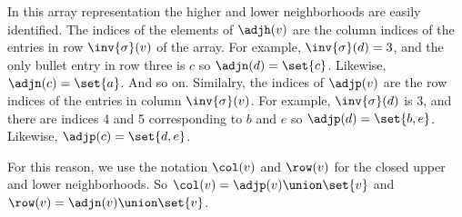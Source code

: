 In this array representation the higher and lower neighborhoods are easily identified.
The indices of the elements of $\adjh(v)$ are the column indices of the entries in row $\inv{\sigma }(v)$ of the array.
For example, $\inv{\sigma }(d) = 3$, and the only bullet entry in row three is $c$ so $\adjn(d) = \set{c}$.
Likewise, $\adjn(c) = \set{a}$.
And so on.
Similalry, the indices of $\adjp(v)$ are the row indices of the entries in column $\inv{\sigma }(v)$.
For example, $\inv{\sigma }(d)$ is $3$, and there are indices 4 and 5 corresponding to $b$ and $e$ so $\adjp(d) = \set{b, e}$.
Likewise, $\adjp(c) = \set{d, e}$.

For this reason, we use the notation $\col(v)$ and $\row(v)$ for the closed upper and lower neighborhoods.
So $\col(v) = \adjp(v) \union \set{v}$ and $\row(v) = \adjn(v) \union \set{v}$.

\blankpage